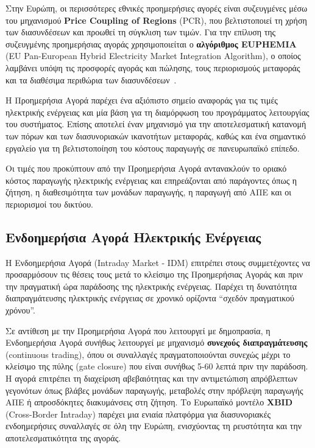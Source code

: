 Στην Ευρώπη, οι περισσότερες εθνικές προημερήσιες αγορές είναι συζευγμένες μέσω του μηχανισμού \textbf{Price Coupling of Regions} (PCR), που βελτιστοποιεί τη χρήση των διασυνδέσεων και προωθεί τη σύγκλιση των τιμών. Για την επίλυση της συζευγμένης προημερήσιας αγοράς χρησιμοποιείται ο \textbf{αλγόριθμος EUPHEMIA} (EU Pan-European Hybrid Electricity Market Integration Algorithm), ο οποίος λαμβάνει υπόψη τις προσφορές αγοράς και πώλησης, τους περιορισμούς μεταφοράς και τα διαθέσιμα περιθώρια των διασυνδέσεων~\cite{euphemia-public-description}.

Η Προημερήσια Αγορά παρέχει ένα αξιόπιστο σημείο αναφοράς για τις τιμές ηλεκτρικής ενέργειας και μία βάση για τη διαμόρφωση του προγράμματος λειτουργίας του συστήματος. Επίσης αποτελεί έναν μηχανισμό για την αποτελεσματική κατανομή των πόρων και των διασυνοριακών ικανοτήτων μεταφοράς, καθώς και ένα σημαντικό εργαλείο για τη βελτιστοποίηση του κόστους παραγωγής σε πανευρωπαϊκό επίπεδο.

Οι τιμές που προκύπτουν από την Προημερήσια Αγορά αντανακλούν το οριακό κόστος παραγωγής ηλεκτρικής ενέργειας και επηρεάζονται από παράγοντες όπως η ζήτηση, η διαθεσιμότητα των μονάδων παραγωγής, η παραγωγή από ΑΠΕ και οι περιορισμοί του δικτύου.

\subsection{Ενδοημερήσια Αγορά Ηλεκτρικής Ενέργειας}
\label{subsec:intraday-market}

Η Ενδοημερήσια Αγορά (Intraday Market - IDM) επιτρέπει στους συμμετέχοντες να προσαρμόσουν τις θέσεις τους μετά το κλείσιμο της Προημερήσιας Αγοράς και πριν την πραγματική ώρα παράδοσης της ηλεκτρικής ενέργειας. Παρέχει τη δυνατότητα διαπραγμάτευσης ηλεκτρικής ενέργειας σε χρονικό ορίζοντα ``σχεδόν πραγματικού χρόνου''.

Σε αντίθεση με την Προημερήσια Αγορά που λειτουργεί με δημοπρασία, η Ενδοημερήσια Αγορά συνήθως λειτουργεί με μηχανισμό \textbf{συνεχούς διαπραγμάτευσης} (continuous trading), όπου οι συναλλαγές πραγματοποιούνται συνεχώς μέχρι το κλείσιμο της πύλης (gate closure) που είναι συνήθως 5-60 λεπτά πριν την παράδοση. Η αγορά επιτρέπει τη διαχείριση αβεβαιότητας και την αντιμετώπιση απρόβλεπτων γεγονότων όπως βλάβες μονάδων παραγωγής, μεταβολές στην πρόβλεψη παραγωγής ΑΠΕ ή απροσδόκητες διακυμάνσεις στη ζήτηση. Το Ευρωπαϊκό μοντέλο \textbf{XBID} (Cross-Border Intraday) παρέχει μια ενιαία πλατφόρμα για διασυνοριακές ενδοημερήσιες συναλλαγές σε όλη την Ευρώπη, ενισχύοντας τη ρευστότητα και την αποτελεσματικότητα της αγοράς.

